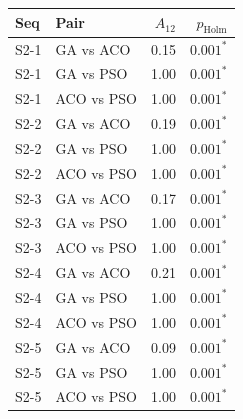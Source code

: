 \begin{tabular}{llrr}
\toprule
Seq & Pair & $A_{12}$ & $p_{\mathrm{Holm}}$ \\
\midrule
S2-1 & GA vs ACO & 0.15 & $0.001^{*}$ \\
S2-1 & GA vs PSO & 1.00 & $0.001^{*}$ \\
S2-1 & ACO vs PSO & 1.00 & $0.001^{*}$ \\
S2-2 & GA vs ACO & 0.19 & $0.001^{*}$ \\
S2-2 & GA vs PSO & 1.00 & $0.001^{*}$ \\
S2-2 & ACO vs PSO & 1.00 & $0.001^{*}$ \\
S2-3 & GA vs ACO & 0.17 & $0.001^{*}$ \\
S2-3 & GA vs PSO & 1.00 & $0.001^{*}$ \\
S2-3 & ACO vs PSO & 1.00 & $0.001^{*}$ \\
S2-4 & GA vs ACO & 0.21 & $0.001^{*}$ \\
S2-4 & GA vs PSO & 1.00 & $0.001^{*}$ \\
S2-4 & ACO vs PSO & 1.00 & $0.001^{*}$ \\
S2-5 & GA vs ACO & 0.09 & $0.001^{*}$ \\
S2-5 & GA vs PSO & 1.00 & $0.001^{*}$ \\
S2-5 & ACO vs PSO & 1.00 & $0.001^{*}$ \\
\bottomrule
\end{tabular}
